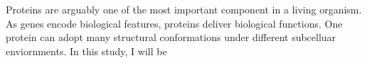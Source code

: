 Proteins are arguably one of the most important component in a living organism. As genes encode biological features, proteins deliver biological functions. One protein can adopt many structural conformations under different subcelluar enviornments.    In this study, I will be 